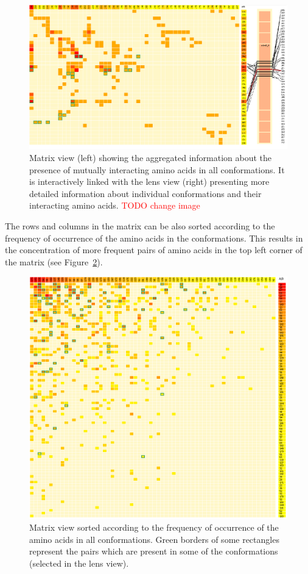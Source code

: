 \documentclass[journal]{vgtc}                %
\begin{document}
\begin{figure}[bt]
  \centering
  \includegraphics[width=1.0\columnwidth]{matrixlens.png}
  \caption{Matrix view (left) showing the aggregated information about the presence of mutually interacting amino acids in all conformations. It is interactively linked with the lens view (right) presenting more detailed information about individual conformations and their interacting amino acids. \textcolor{red}{TODO change image}}
  \label{fig:matrixlens}
\end{figure}

The rows and columns in the matrix can be also sorted according to the frequency of occurrence of the amino acids in the conformations. 
This results in the concentration of more frequent pairs of amino acids in the top left corner of the matrix (see Figure~\ref{fig:sort}).

\begin{figure}[bt]
  \centering
  \includegraphics[width=0.8\columnwidth]{sort.png}
  \caption{Matrix view sorted according to the frequency of occurrence of the amino acids in all conformations. Green borders of some rectangles represent the pairs which are present in some of the conformations (selected in the lens view).}
  \label{fig:sort}
\end{figure}
\end{document}
